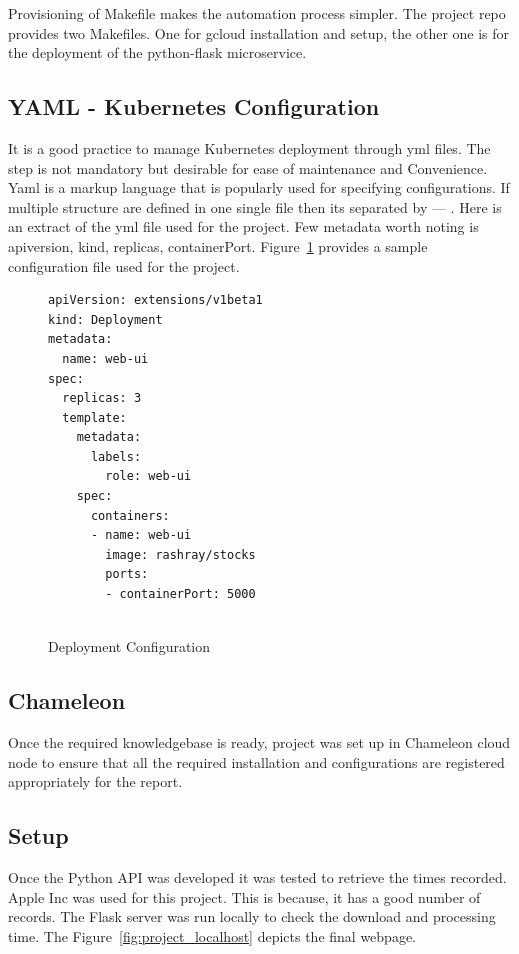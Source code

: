 Provisioning of Makefile makes the automation process simpler. The project
repo provides two Makefiles. One for gcloud installation and setup, the other
one is for the deployment of the python-flask microservice.
  
\subsection{YAML - Kubernetes Configuration}
It is a good practice to manage Kubernetes deployment through yml files. The
step is not mandatory but desirable for ease of maintenance and Convenience.
Yaml is a markup language that is popularly used for specifying
configurations. If multiple structure are defined in one single file then its
separated by --- . Here is an extract of the yml file used for the project.
Few metadata worth noting is apiversion, kind, replicas, containerPort.
Figure~\ref{F:svc-setup} provides a sample configuration file used for the
project.

\begin{figure}
\begin{footnotesize}  
\begin{verbatim}
apiVersion: extensions/v1beta1
kind: Deployment
metadata:
  name: web-ui
spec:
  replicas: 3
  template:
    metadata:
      labels:
        role: web-ui
    spec:
      containers:
      - name: web-ui
        image: rashray/stocks
        ports:
        - containerPort: 5000
  
\end{verbatim}
\end{footnotesize}
\caption{Deployment Configuration}\label{F:svc-setup}
\end{figure}
\subsection{Chameleon}
Once the required knowledgebase is ready, project was set up in Chameleon
cloud node to ensure that all the required installation and configurations are
registered appropriately for the report.

\subsection{Setup}

Once the Python API was developed it was tested to retrieve the times
recorded. Apple Inc was used for this project. This is because, it has a good
number of records. The Flask server was run locally to check the download and
processing time. The Figure~\ref{fig:project_localhost} depicts the final
webpage.

